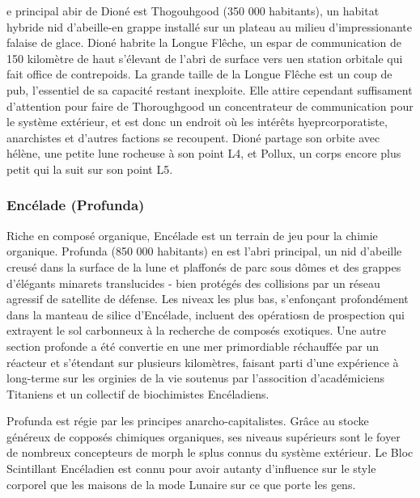                                                                      e principal abir de Dioné est Thogouhgood (350 000 habitants), un habitat hybride nid d'abeille-en grappe installé sur un plateau au milieu d'impressionante falaise de glace. Dioné habrite la Longue Flêche, un espar de communication de 150 kilomètre de haut s'élevant de l'abri de surface vers uen station orbitale qui fait office de contrepoids. La grande taille de la Longue Flêche est un coup de pub, l'essentiel de sa capacité restant inexploite. Elle attire cependant suffisament d'attention pour faire de Thoroughgood un concentrateur de communication pour le système extérieur, et est donc un endroit où les intérêts hyeprcorporatiste, anarchistes et d'autres factions se recoupent. Dioné partage son orbite avec hélène, une petite  lune rocheuse à son point L4, et Pollux, un corps encore plus petit qui la suit sur son point L5. 

                                                                     \subsubsection{Encélade (Profunda)} \label{sec:enceladus-profunda} 

                                                                     Riche en composé organique, Encélade est un terrain de jeu pour la chimie organique. Profunda (850 000 habitants) en est l'abri principal, un nid d'abeille creusé dans la surface de la lune et plaffonés de parc sous dômes et des grappes d'élégants minarets translucides - bien protégés des collisions par un réseau agressif de satellite de défense. Les niveax les plus bas, s'enfonçant profondément dans la manteau de silice d'Encélade, incluent des opératiosn de prospection qui extrayent le sol carbonneux à la recherche de composés exotiques. Une autre section profonde a été convertie en une mer primordiable réchauffée par un réacteur et s'étendant sur plusieurs kilomètres, faisant parti d'une expérience à long-terme sur les orginies de la vie soutenus par l'assocition d'académiciens Titaniens et un collectif de biochimistes Encéladiens. 

                                                                     Profunda est régie par les principes anarcho-capitalistes. Grâce au stocke généreux de copposés chimiques organiques, ses niveaus supérieurs sont le foyer de nombreux concepteurs de morph le splus connus du système extérieur. Le Bloc Scintillant Encéladien est connu pour avoir autanty d'influence sur le style corporel que les maisons de la mode Lunaire sur ce que porte les gens. 

